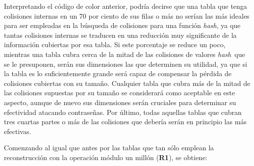 \documentclass[12pt,spanish,listoffigures,listoftables,listofalgorithms]{tfgetsinf}
\newcommand{\hash}{\textit{hash}}
\begin{document}
Interpretando el código de color anterior, podría decirse que una tabla que tenga colisiones internas en un 70 por ciento de sus filas o más no serían las más ideales para ser empleadas en la búsqueda de colisiones para una función \hash, ya que tantas colisiones internas se traducen en una reducción muy significante de la información cubiertas por esa tabla. Si este porcentaje se reduce un poco, mientras una tabla cubra cerca de la mitad de las colisiones de valores \hash~que se le presuponen, serán sus dimensiones las que determinen su utilidad, ya que si la tabla es lo suficientemente grande será capaz de compensar la pérdida de colisiones cubiertas con su tamaño. Cualquier tabla que cubra más de la mitad de las colisiones supuestas por su tamaño se considerará como aceptable en este aspecto, aunque de nuevo sus dimensiones serán cruciales para determinar su efectividad atacando contraseñas. Por último, todas aquellas tablas que cubran tres cuartas partes o más de las colisiones que debería serán en principio las más efectivas.

Comenzando al igual que antes por las tablas que tan sólo emplean la reconstrucción con la operación módulo un millón (\textbf{R1}), se obtiene:
\end{document}
